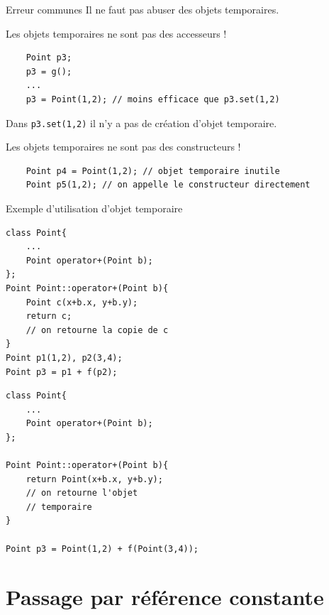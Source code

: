 \begin{frame}[fragile=singleslide]{Erreur communes}
    Il ne faut pas abuser des objets temporaires.

    \begin{alertblock}{Les objets temporaires ne sont pas des accesseurs !}
            \begin{verbatim}
    Point p3;
    p3 = g();
    ...
    p3 = Point(1,2); // moins efficace que p3.set(1,2)
            \end{verbatim}
    Dans \texttt{p3.set(1,2)} il n'y a pas de création d'objet temporaire.
    \end{alertblock}
    \begin{alertblock}{Les objets temporaires ne sont pas des constructeurs !}
        
            \begin{verbatim}
    Point p4 = Point(1,2); // objet temporaire inutile
    Point p5(1,2); // on appelle le constructeur directement
            \end{verbatim} 
    \end{alertblock}
\end{frame}

\begin{frame}[fragile=singleslide]{Exemple d'utilisation d'objet temporaire}
    \begin{minipage}{0.47\linewidth}
    
        \begin{verbatim}
class Point{
    ...
    Point operator+(Point b);
};
Point Point::operator+(Point b){
    Point c(x+b.x, y+b.y);
    return c;
    // on retourne la copie de c
}
Point p1(1,2), p2(3,4);
Point p3 = p1 + f(p2);
        \end{verbatim}
    \end{minipage}
    \hfill
    \begin{minipage}{0.47\linewidth}
    
        \begin{verbatim}
class Point{
    ...
    Point operator+(Point b);
};

Point Point::operator+(Point b){
    return Point(x+b.x, y+b.y);
    // on retourne l'objet
    // temporaire
}

Point p3 = Point(1,2) + f(Point(3,4));
        \end{verbatim}
    \end{minipage}
\end{frame}

\section{Passage par référence constante}

